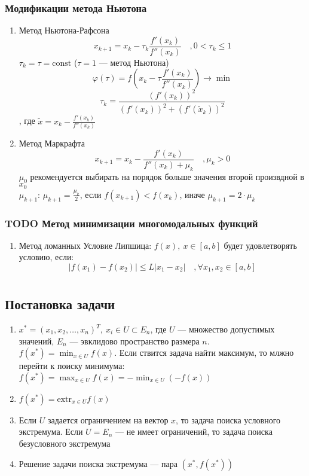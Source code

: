 \documentclass[oneside]{book}
\newcommand{\const}{\text{const}}
\theoremstyle{plain}
\theoremstyle{remark}
\theoremstyle{definition}
\begin{document}
\subsection{Модификации метода Ньютона}
\label{sec:org2a85aaa}
\begin{enumerate}
\item Метод Ньютона-Рафсона
\label{sec:orgd4b26d1}
\[ x_{k + 1} = x_k - \tau_k\frac{f'(x_k)}{f''(x_k)}\quad, 0 < \tau_k \le 1 \]
\(\tau_k = \tau = \const\) (\(\tau = 1\) --- метод Ньютона)
\[ \varphi(\tau) = f(x_k - \tau\frac{f'(x_k)}{f''(x_k)}) \to \min \]
\[ \tau_k = \frac{(f'(x_k))^2}{(f'(x_k))^2 + (f'(\tilde{x}_k))^2} \]
, где \(\tilde{x} = x_k - \frac{f'(x_k)}{f''(x_k)}\)
\item Метод Маркрафта
\label{sec:org035fa93}
\[ x_{k + 1} = x_k - \frac{f'(x_k)}{f''(x_k) + \mu_k}\quad,\mu_k > 0 \]
\(\mu_0\) рекомендуется выбирать на порядок больше значения второй произвдной в \(x_0\) \\
\(\mu_{k + 1}\): \(\mu_{k + 1} = \frac{\mu_k}{2}\), если \(f(x_{k + 1}) < f(x_k)\), иначе \(\mu_{k + 1} = 2\cdot\mu_k\)
\end{enumerate}
\subsection{{\bfseries\sffamily TODO} Метод минимизации многомодальных функций}
\label{sec:orgdc08915}
\begin{enumerate}
\item Метод ломанных
\label{sec:org49b2b17}
Условие Липшица: \(f(x),\ x\in [a, b]\) будет удовлетворять условию, если:
\[ |f(x_1) - f(x_2)| \le L|x_1 - x_2|\quad,\forall x_1, x_2 \in [a, b] \]
\end{enumerate}
\chapter{}
\label{sec:org9ff927f}
\section{Постановка задачи}
\label{sec:orgc67f527}
\begin{enumerate}
\item \(x^* = (x_1, x_2, \dots, x_n)^T,\ x_i \in U \subset E_n\), где \(U\) --- множество допустимых значений, \(E_n\) --- эвклидово
пространство размера \(n\). \(f(x^*) = \min_{x \in U} f(x)\). Если
ствится задача найти максимум, то млжно перейти к поиску минимума: \(f(x^*) = \max_{x\in U}f(x) = -\min_{x \in U}(-f(x))\)
\item \(f(x^*) = \text{extr}_{x \in U}f(x)\)
\item Если \(U\) задается ограничением на вектор \(x\), то задача поиска
условного экстремума. Если \(U = E_n\) --- не имеет ограничений,
то задача поиска безусловного экстремума
\item Решение задачи поиска экстремума --- пара \((x^*, f(x^*))\)
\end{enumerate}
\end{document}
